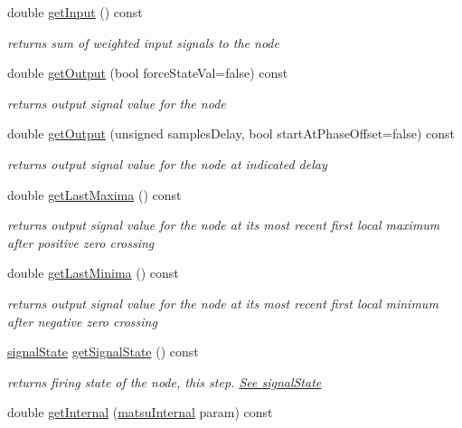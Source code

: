 \begin{DoxyCompactItemize}
double \hyperlink{classMatsuNode_a2006c7d31f2c7a67ab831a642cafbcdc}{get\+Input} () const 
\begin{DoxyCompactList}\small\item\em returns sum of weighted input signals to the node \end{DoxyCompactList}\item 
double \hyperlink{classMatsuNode_a406387b97ede63dde8e07c46135c04a8}{get\+Output} (bool force\+State\+Val=false) const 
\begin{DoxyCompactList}\small\item\em returns output signal value for the node \end{DoxyCompactList}\item 
double \hyperlink{classMatsuNode_a16709dd3b8226ea7096b526e93e125fe}{get\+Output} (unsigned samples\+Delay, bool start\+At\+Phase\+Offset=false) const 
\begin{DoxyCompactList}\small\item\em returns output signal value for the node at indicated delay \end{DoxyCompactList}\item 
double \hyperlink{classMatsuNode_af1113de2576adb3c08688f9327c1d039}{get\+Last\+Maxima} () const 
\begin{DoxyCompactList}\small\item\em returns output signal value for the node at its most recent first local maximum after positive zero crossing \end{DoxyCompactList}\item 
double \hyperlink{classMatsuNode_ac797298c59b361c383e6e73bca36731d}{get\+Last\+Minima} () const 
\begin{DoxyCompactList}\small\item\em returns output signal value for the node at its most recent first local minimum after negative zero crossing \end{DoxyCompactList}\item 
\hyperlink{classMatsuNode_abd587a4a72c6774f689d21c78a8bc239}{signal\+State} \hyperlink{classMatsuNode_a11928c0214ae5abc50518d04592fc966}{get\+Signal\+State} () const 
\begin{DoxyCompactList}\small\item\em returns firing state of the node, this step. \hyperlink{classMatsuNode_abd587a4a72c6774f689d21c78a8bc239}{See signal\+State} \end{DoxyCompactList}\item 
double \hyperlink{classMatsuNode_a86067c83de388aedcea38fe19a600a39}{get\+Internal} (\hyperlink{classMatsuNode_a5899aeb63b46cd45b1dc825ad518289a}{matsu\+Internal} param) const 

\end{DoxyCompactItemize}
